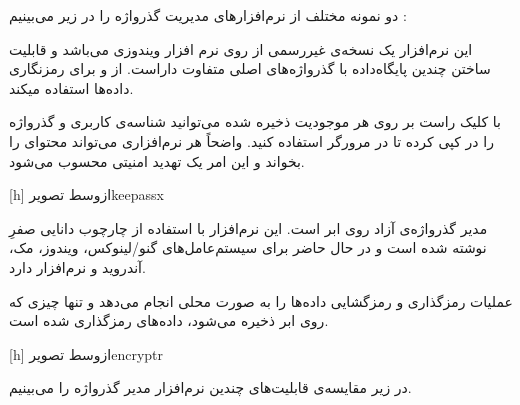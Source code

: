 

دو نمونه مختلف از نرم‌افزار‌های مدیریت گذرواژه را در زیر می‌بینیم :


این نرم‌افزار یک نسخه‌ی غیررسمی از روی نرم افزار ویندوزی  می‌باشد و قابلیت ساختن چندین پایگاه‌داده با گذرواژه‌های اصلی متفاوت داراست.  از  و  برای رمز‌نگاری داده‌ها استفاده میکند. 

با کلیک راست بر روی هر موجودیت ذخیره شده می‌توانید شناسه‌ی کاربری و گذرواژه را در  کپی کرده تا در مرورگر استفاده کنید. واضحاً هر نرم‌افزاری می‌تواند محتوای  را بخواند و این امر یک تهدید امنیتی محسوب می‌شود.

[h]
‌ازوسط
‌تصویر{keepassx}


 مدیر گذرواژه‌ی آزاد روی ابر است. این نرم‌افزار با استفاده از چارچوب دانایی صفرِ  نوشته شده است و در حال حاضر برای سیستم‌عامل‌های گنو/لینوکس، ویندوز، مک، آندروید و  نرم‌افزار دارد. 

 عملیات رمزگذاری و رمزگشایی داده‌ها را به صورت محلی انجام می‌دهد و تنها چیزی که روی ابر ذخیره می‌شود، داده‌های رمز‌گذاری شده است.

[h]
‌ازوسط
‌تصویر{encryptr}


در زیر مقایسه‌ی قابلیت‌های چندین نرم‌افزار مدیر گذرواژه را می‌بینیم.

